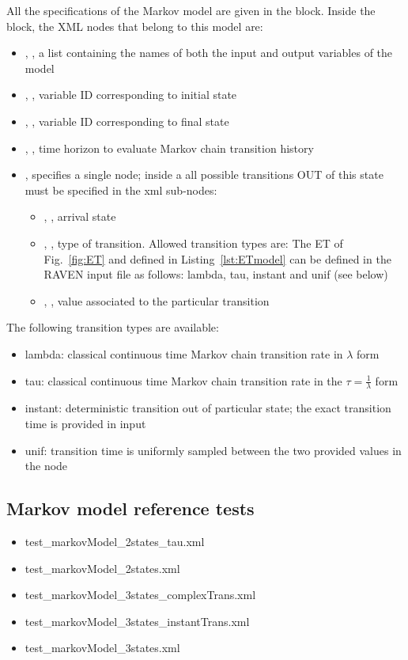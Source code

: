 All the specifications of the Markov model are given in the  block. 
Inside the  block, the XML nodes that belong to this model are:
\begin{itemize}
  \item  {}, , a list containing the names of both the input and output variables of the model
  \item  {}, , variable ID corresponding to initial state
  \item  {}, , variable ID corresponding to final state
  \item  {}, , time horizon to evaluate Markov chain transition history
  \item  {}, specifies a single node; inside a  all possible transitions OUT of this state must be specified
                          in the  xml sub-nodes:
	  \begin{itemize}
	  	\item {}, , arrival state
	    \item {}, , type of transition. Allowed transition types are: The ET of Fig.~\ref{fig:ET} and defined in Listing~\ref{lst:ETmodel} can be defined in the RAVEN input file as follows: lambda, tau, instant and unif (see below)
	    \item {}, , value associated to the particular transition
	  \end{itemize}
\end{itemize}

The following transition types are available:
\begin{itemize}
  \item lambda: classical continuous time Markov chain transition rate in $\lambda$ form
  \item tau: classical continuous time Markov chain transition rate in the $\tau = \frac{1}{\lambda}$ form
  \item instant: deterministic transition out of particular state; the exact transition time is provided in input
  \item unif: transition time is uniformly sampled between the two provided values in the  node
\end{itemize}

\subsection{Markov model reference tests}
\begin{itemize}
	\item test\_markovModel\_2states\_tau.xml
	\item test\_markovModel\_2states.xml
	\item test\_markovModel\_3states\_complexTrans.xml
	\item test\_markovModel\_3states\_instantTrans.xml
	\item test\_markovModel\_3states.xml
\end{itemize}
